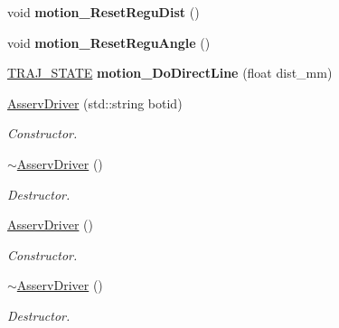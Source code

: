 \begin{DoxyCompactItemize}
void {\bfseries motion\+\_\+\+Reset\+Regu\+Dist} ()
\item 
\mbox{\label{classAsservDriver_acd102376cacdf0fc40a587f25359a25e}} 
void {\bfseries motion\+\_\+\+Reset\+Regu\+Angle} ()
\item 
\mbox{\label{classAsservDriver_a9d967bff5061c791226484bbd998362b}} 
\hyperlink{path__manager_8h_adb3360abeb29758da93865c8afcb80eb}{T\+R\+A\+J\+\_\+\+S\+T\+A\+TE} {\bfseries motion\+\_\+\+Do\+Direct\+Line} (float dist\+\_\+mm)
\item 
\mbox{\label{classAsservDriver_a2ea943e6faf4d9b6d4c2a61b85849194}} 
\hyperlink{classAsservDriver_a2ea943e6faf4d9b6d4c2a61b85849194}{Asserv\+Driver} (std\+::string botid)
\begin{DoxyCompactList}\small\item\em Constructor. \end{DoxyCompactList}\item 
\mbox{\label{classAsservDriver_a5960b3ced1e727d33ded6ff469fc1a78}} 
\hyperlink{classAsservDriver_a5960b3ced1e727d33ded6ff469fc1a78}{$\sim$\+Asserv\+Driver} ()
\begin{DoxyCompactList}\small\item\em Destructor. \end{DoxyCompactList}\item 
\mbox{\label{classAsservDriver_a70982198e21af96e5d4faa6ce9b0608c}} 
\hyperlink{classAsservDriver_a70982198e21af96e5d4faa6ce9b0608c}{Asserv\+Driver} ()
\begin{DoxyCompactList}\small\item\em Constructor. \end{DoxyCompactList}\item 
\mbox{\label{classAsservDriver_a5960b3ced1e727d33ded6ff469fc1a78}} 
\hyperlink{classAsservDriver_a5960b3ced1e727d33ded6ff469fc1a78}{$\sim$\+Asserv\+Driver} ()
\begin{DoxyCompactList}\small\item\em Destructor. \end{DoxyCompactList}\item 
\mbox{\label{classAsservDriver_a636bf5413d2cf0419f188a4965340758}} 

\end{DoxyCompactItemize}
